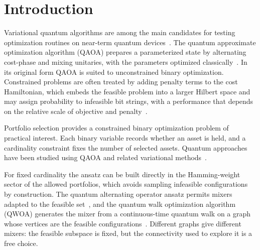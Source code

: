 \section{\label{sec:intro}Introduction}

Variational quantum algorithms are among the main candidates for testing optimization routines on near-term quantum devices~\cite{Cerezo2021,Moll2018}. The quantum approximate optimization algorithm (QAOA) prepares a parameterized state by alternating cost-phase and mixing unitaries, with the parameters optimized classically~\cite{Farhi2014,Blekos2024}. In its original form QAOA is suited to unconstrained binary optimization. Constrained problems are often treated by adding penalty terms to the cost Hamiltonian, which embeds the feasible problem into a larger Hilbert space and may assign probability to infeasible bit strings, with a performance that depends on the relative scale of objective and penalty~\cite{Hadfield2019,Blekos2024}.

Portfolio selection provides a constrained binary optimization problem of practical interest. Each binary variable records whether an asset is held, and a cardinality constraint fixes the number of selected assets. Quantum approaches have been studied using QAOA and related variational methods~\cite{Hodson2019,Slate2021}.


For fixed cardinality the ansatz can be built directly in the Hamming-weight sector of the allowed portfolios, which avoids sampling infeasible configurations by construction. The quantum alternating operator ansatz permits mixers adapted to the feasible set~\cite{Hadfield2019}, and the quantum walk optimization algorithm (QWOA) generates the mixer from a continuous-time quantum walk on a graph whose vertices are the feasible configurations~\cite{Marsh2019,Marsh2020}. Different graphs give different mixers: the feasible subspace is fixed, but the connectivity used to explore it is a free choice.

